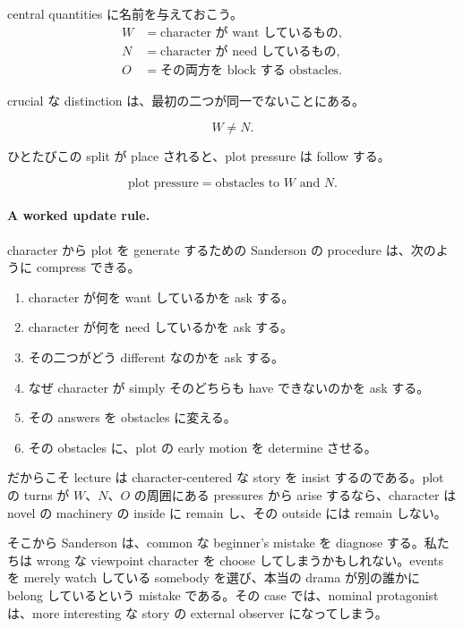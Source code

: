 central quantities に名前を与えておこう。
\begin{align}
W &= \text{character が want しているもの},\\
N &= \text{character が need しているもの},\\
O &= \text{その両方を block する obstacles}.
\end{align}

crucial な distinction は、最初の二つが同一でないことにある。

\begin{equation}
W \neq N.
\end{equation}

ひとたびこの split が place されると、plot pressure は follow する。

\begin{equation}
\text{plot pressure} = \text{obstacles to } W \text{ and } N.
\end{equation}

\paragraph{A worked update rule.} character から plot を generate するための Sanderson の procedure は、次のように compress できる。
\begin{enumerate}
\item character が何を want しているかを ask する。
\item character が何を need しているかを ask する。
\item その二つがどう different なのかを ask する。
\item なぜ character が simply そのどちらも have できないのかを ask する。
\item その answers を obstacles に変える。
\item その obstacles に、plot の early motion を determine させる。
\end{enumerate}

だからこそ lecture は character-centered な story を insist するのである。plot の turns が \(W\)、\(N\)、\(O\) の周囲にある pressures から arise するなら、character は novel の machinery の inside に remain し、その outside には remain しない。

そこから Sanderson は、common な beginner's mistake を diagnose する。私たちは wrong な viewpoint character を choose してしまうかもしれない。events を merely watch している somebody を選び、本当の drama が別の誰かに belong しているという mistake である。その case では、nominal protagonist は、more interesting な story の external observer になってしまう。

